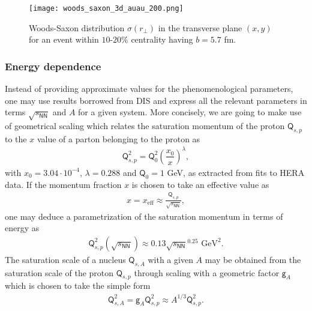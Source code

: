 \begin{figure}[!hbt]
	\texttt{[image: woods\_saxon\_3d\_auau\_200.png]}
	\caption{\normalsize Woods-Saxon distribution $\sigma(r_\perp)$ in the transverse plane $(x,y)$ for an event within $10$-$20\%$ centrality having $b=5.7$ fm.} 
\end{figure}
 
\subsubsection*{Energy dependence}
Instead of providing approximate values for the phenomenological parameters, one may use results borrowed from {\sffamily DIS} and express all the relevant parameters in terms $\sqrt{s_{\textsf{NN}}}$ and $A$ for a given system. More concisely, we are going to make use of {\sffamily\color{ming}geometrical scaling} which relates the saturation momentum of the proton $\textsf{Q}_{s,p}$ to the $x$ value of a parton belonging to the proton as
\begin{align*}
    \textsf{Q}_{s,p}^2=\textsf{Q}_0^2\left(\dfrac{x_0}{x}\right)^\lambda,
\end{align*}
with $x_0=3.04\cdot 10^{-4}$, $\lambda=0.288$ and $\textsf{Q}_0=1$ GeV, as extracted from fits to {\sffamily HERA} data\cite{gbw}. If the momentum fraction $x$ is chosen to take an effective value as
\begin{align*}
    x=x_\text{eff}\approx \frac{\textsf{Q}_{s,p}}{\sqrt{s_{\textsf{NN}}}},
\end{align*}
one may deduce a parametrization of the saturation momentum in terms of energy as
\begin{align*}
    \textsf{Q}_{s, p}^{2}(\sqrt{s_{\textsf{NN}}}) \approx 0.13 \sqrt{s_{\textsf{NN}}} ^{0.25} \text{ GeV}^{2}.
\end{align*}
The saturation scale of a nucleus $\textsf{Q}_{s,A}$ with a given $A$ may be obtained from the saturation scale of the proton $\textsf{Q}_{s,p}$ through scaling with a geometric factor $\textsf{g}_A$ which is chosen to take the simple form
\begin{align*}
    \textsf{Q}_{s,A}^2=\textsf{g}_A\textsf{Q}_{s,p}^2\approx A^{1/3}\textsf{Q}_{s,p}^2.
\end{align*}
